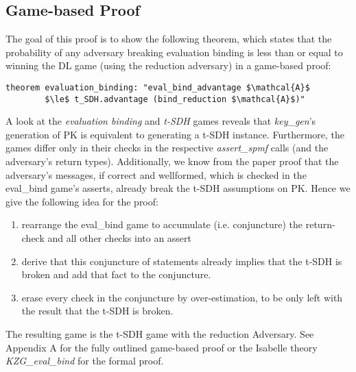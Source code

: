 \subsection*{Game-based Proof}
\label{security:binding:gamebased}
The goal of this proof is to show the following theorem, which states that the probability of any adversary breaking evaluation binding is less than or equal to winning the DL game (using the reduction adversary) in a game-based proof:
\begin{lstlisting}[language=isabelle]
    theorem evaluation_binding: "eval_bind_advantage $\mathcal{A}$ 
        $\le$ t_SDH.advantage (bind_reduction $\mathcal{A}$)"
\end{lstlisting}

A look at the \textit{evaluation binding} and \textit{t-SDH} games reveals that \textit{key\_gen}'s generation of PK is equivalent to generating a t-SDH instance. Furthermore, the games differ only in their checks in the respective \textit{assert\_spmf} calls (and the adversary's return types).  
Additionally, we know from the paper proof that the adversary's messages, if correct and wellformed, which is checked in the eval\_bind game's asserts, already break the t-SDH assumptions on PK. 
Hence we give the following idea for the proof:
\begin{enumerate}
    \item rearrange the eval\_bind game to accumulate (i.e. conjuncture) the return-check and all other checks into an assert
    \item derive that this conjuncture of statements already implies that the t-SDH is broken and add that fact to the conjuncture.
    \item erase every check in the conjuncture by over-estimation, to be only left with the result that the t-SDH is broken.
\end{enumerate}
The resulting game is the t-SDH game with the reduction Adversary. 
See Appendix A for the fully outlined game-based proof or the Isabelle theory \textit{KZG\_eval\_bind} for the formal proof.


